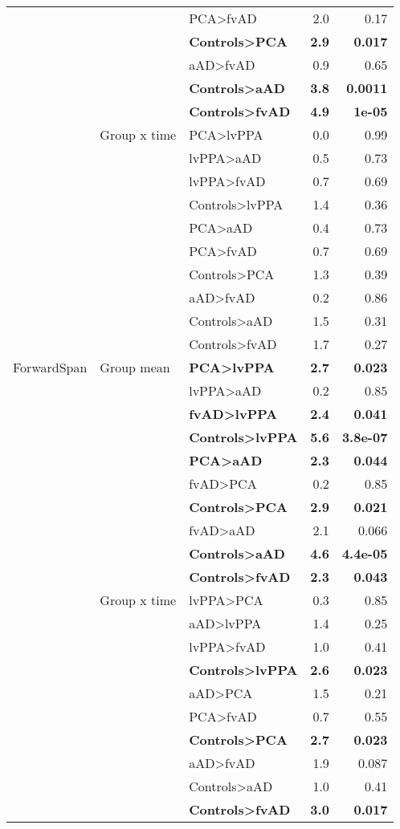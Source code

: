 \documentclass[]{article}
\begin{document}
\begin{table}[ht]
{\begin{tabular}{lllrr}
   &  & PCA>fvAD & 2.0 & 0.17 \\ 
   &  & \textbf{Controls>PCA} & \textbf{2.9} & \textbf{0.017} \\ 
   &  & aAD>fvAD & 0.9 & 0.65 \\ 
   &  & \textbf{Controls>aAD} & \textbf{3.8} & \textbf{0.0011} \\ 
   &  & \textbf{Controls>fvAD} & \textbf{4.9} & \textbf{1e-05} \\ 
   & Group x time & PCA>lvPPA & 0.0 & 0.99 \\ 
   &  & lvPPA>aAD & 0.5 & 0.73 \\ 
   &  & lvPPA>fvAD & 0.7 & 0.69 \\ 
   &  & Controls>lvPPA & 1.4 & 0.36 \\ 
   &  & PCA>aAD & 0.4 & 0.73 \\ 
   &  & PCA>fvAD & 0.7 & 0.69 \\ 
   &  & Controls>PCA & 1.3 & 0.39 \\ 
   &  & aAD>fvAD & 0.2 & 0.86 \\ 
   &  & Controls>aAD & 1.5 & 0.31 \\ 
   &  & Controls>fvAD & 1.7 & 0.27 \\ 
  ForwardSpan & Group mean & \textbf{PCA>lvPPA} & \textbf{2.7} & \textbf{0.023} \\ 
   &  & lvPPA>aAD & 0.2 & 0.85 \\ 
   &  & \textbf{fvAD>lvPPA} & \textbf{2.4} & \textbf{0.041} \\ 
   &  & \textbf{Controls>lvPPA} & \textbf{5.6} & \textbf{3.8e-07} \\ 
   &  & \textbf{PCA>aAD} & \textbf{2.3} & \textbf{0.044} \\ 
   &  & fvAD>PCA & 0.2 & 0.85 \\ 
   &  & \textbf{Controls>PCA} & \textbf{2.9} & \textbf{0.021} \\ 
   &  & fvAD>aAD & 2.1 & 0.066 \\ 
   &  & \textbf{Controls>aAD} & \textbf{4.6} & \textbf{4.4e-05} \\ 
   &  & \textbf{Controls>fvAD} & \textbf{2.3} & \textbf{0.043} \\ 
   & Group x time & lvPPA>PCA & 0.3 & 0.85 \\ 
   &  & aAD>lvPPA & 1.4 & 0.25 \\ 
   &  & lvPPA>fvAD & 1.0 & 0.41 \\ 
   &  & \textbf{Controls>lvPPA} & \textbf{2.6} & \textbf{0.023} \\ 
   &  & aAD>PCA & 1.5 & 0.21 \\ 
   &  & PCA>fvAD & 0.7 & 0.55 \\ 
   &  & \textbf{Controls>PCA} & \textbf{2.7} & \textbf{0.023} \\ 
   &  & aAD>fvAD & 1.9 & 0.087 \\ 
   &  & Controls>aAD & 1.0 & 0.41 \\ 
   &  & \textbf{Controls>fvAD} & \textbf{3.0} & \textbf{0.017} \\ 
   \hline
\end{tabular}
}
\end{table}
\end{document}
